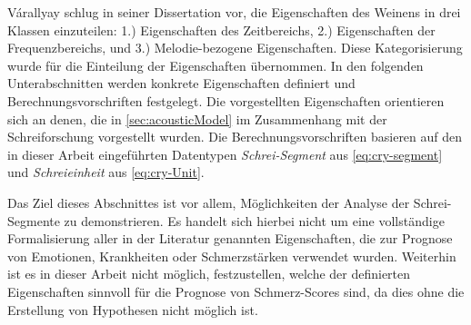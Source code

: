 Várallyay \cite[S. 16 - 17]{cry_thesis} schlug in seiner Dissertation vor, die Eigenschaften des Weinens in drei Klassen einzuteilen: 1.) Eigenschaften des Zeitbereichs, 2.) Eigenschaften der Frequenzbereichs, und 3.) Melodie-bezogene Eigenschaften. Diese Kategorisierung wurde für die Einteilung der Eigenschaften übernommen. In den folgenden Unterabschnitten werden konkrete Eigenschaften definiert und Berechnungsvorschriften festgelegt. Die vorgestellten Eigenschaften orientieren sich an denen, die in \autoref{sec:acousticModel} im Zusammenhang mit der Schreiforschung vorgestellt wurden. Die Berechnungsvorschriften basieren auf den in dieser Arbeit eingeführten Datentypen \emph{Schrei-Segment} aus \autoref{eq:cry-segment} und \emph{Schreieinheit} aus \autoref{eq:cry-Unit}.

Das Ziel dieses Abschnittes ist vor allem, Möglichkeiten der Analyse der Schrei-Segmente zu demonstrieren. Es handelt sich hierbei nicht um eine vollständige Formalisierung aller in der Literatur genannten Eigenschaften, die zur Prognose von Emotionen, Krankheiten oder Schmerzstärken verwendet wurden. Weiterhin ist es in dieser Arbeit nicht möglich, festzustellen, welche der definierten Eigenschaften sinnvoll für die Prognose von Schmerz-Scores sind, da dies ohne die Erstellung von Hypothesen nicht möglich ist.



